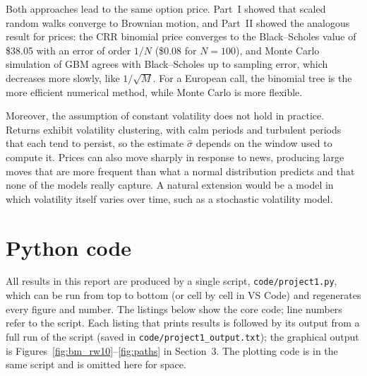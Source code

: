 \documentclass[12pt]{amsart}
\begin{document}
Both approaches lead to the same option price. Part~I showed that scaled random walks converge
to Brownian motion, and Part~II showed the analogous result for prices: the CRR binomial price
converges to the Black--Scholes value of \$38.05 with an error of order $1/N$ (\$0.08 for
$N = 100$), and Monte Carlo simulation of GBM agrees with Black--Scholes up to sampling error,
which decreases more slowly, like $1/\sqrt{M}$. For a European call, the binomial tree is the
more efficient numerical method, while Monte Carlo is more flexible.

Moreover, the assumption of constant volatility does not hold in practice. Returns exhibit
volatility clustering, with calm periods and turbulent periods that each tend to persist, so the
estimate $\hat\sigma$ depends on the window used to compute it. Prices can also move sharply in
response to news, producing large moves that are more frequent than what a normal distribution
predicts and that none of the models really capture. A natural extension would be a model in which
volatility itself varies over time, such as a stochastic volatility model. 




\clearpage
\appendix
\section{Python code}\label{app:code}
All results in this report are produced by a single script, \texttt{code/project1.py}, which can
be run from top to bottom (or cell by cell in VS Code) and regenerates every figure and number.
The listings below show the core code; line numbers refer to the script. Each listing that prints
results is followed by its output from a full run of the script (saved in
\texttt{code/project1\_output.txt}); the graphical output is Figures~\ref{fig:bm_rw10}--\ref{fig:paths}
in Section~3. The plotting code is in the same script and is omitted here for space.







\end{document}
